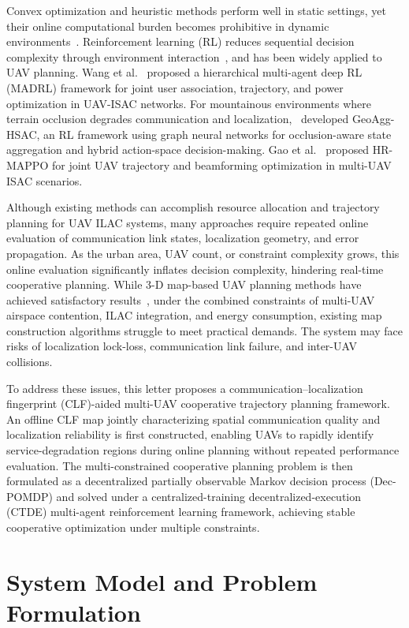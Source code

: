 \documentclass[lettersize,journal]{IEEEtran}
\begin{document}
Convex optimization and heuristic methods perform well in static settings, yet their online computational burden becomes prohibitive in dynamic environments~\cite{ref9}. Reinforcement learning (RL) reduces sequential decision complexity through environment interaction~\cite{ref10}, and has been widely applied to UAV planning. Wang et al.~\cite{ref9} proposed a hierarchical multi-agent deep RL (MADRL) framework for joint user association, trajectory, and power optimization in UAV-ISAC networks. For mountainous environments where terrain occlusion degrades communication and localization,~\cite{ref11} developed GeoAgg-HSAC, an RL framework using graph neural networks for occlusion-aware state aggregation and hybrid action-space decision-making. Gao et al.~\cite{ref12} proposed HR-MAPPO for joint UAV trajectory and beamforming optimization in multi-UAV ISAC scenarios.

Although existing methods can accomplish resource allocation and trajectory planning for UAV ILAC systems, many approaches require repeated online evaluation of communication link states, localization geometry, and error propagation. As the urban area, UAV count, or constraint complexity grows, this online evaluation significantly inflates decision complexity, hindering real-time cooperative planning. While 3-D map-based UAV planning methods have achieved satisfactory results~\cite{ref13,ref14,ref15}, under the combined constraints of multi-UAV airspace contention, ILAC integration, and energy consumption, existing map construction algorithms struggle to meet practical demands. The system may face risks of localization lock-loss, communication link failure, and inter-UAV collisions.

To address these issues, this letter proposes a communication--localization fingerprint (CLF)-aided multi-UAV cooperative trajectory planning framework. An offline CLF map jointly characterizing spatial communication quality and localization reliability is first constructed, enabling UAVs to rapidly identify service-degradation regions during online planning without repeated performance evaluation. The multi-constrained cooperative planning problem is then formulated as a decentralized partially observable Markov decision process (Dec-POMDP) and solved under a centralized-training decentralized-execution (CTDE) multi-agent reinforcement learning framework, achieving stable cooperative optimization under multiple constraints.

\section{System Model and Problem Formulation}
\end{document}
